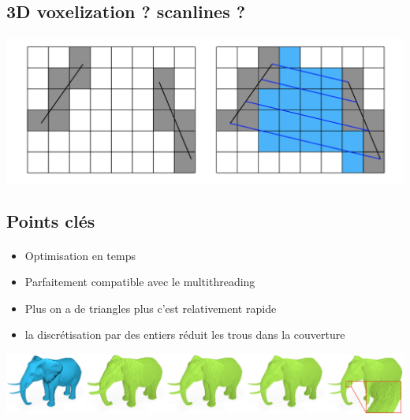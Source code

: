 \subsection{3D voxelization ? scanlines ?}

\begin{frame}[fragile=singleslide]{\insertsectionhead}
  \framesubtitle{\insertsubsectionhead}
  \begin{center}
      \includegraphics[scale=0.42]{resources/scanlines.png}
  \end{center}
\end{frame}

\subsection{Points clés}

\begin{frame}[fragile=singleslide]{\insertsectionhead}
  \framesubtitle{\insertsubsectionhead}
  \begin{itemize}
      \item Optimisation en temps
      \item Parfaitement compatible avec le multithreading
      \item Plus on a de triangles plus c'est relativement rapide
      \item la discrétisation par des entiers réduit les trous dans la couverture
    \end{itemize}
    \vspace{0.6cm}
    \begin{center}
        \includegraphics[scale=0.3]{resources/elephant.png}
    \end{center}
\end{frame}

